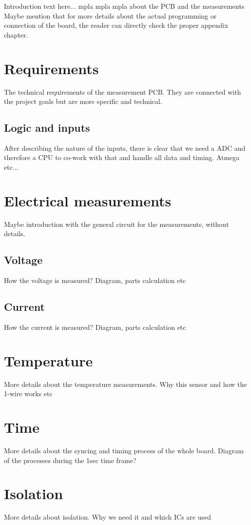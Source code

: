Introduction text here...
mpla mpla mpla about the PCB and the measurements
Maybe mention that for more details about the actual programming or connection of the board, the reader can directly check the proper appendix chapter.

\section{Requirements}
The technical requirements of the measurement PCB.
They are connected with the project goals but are more specific and technical. 

\subsection{Logic and inputs}
After describing the nature of the inputs, there is clear that we need a ADC and therefore a CPU to co-work with that and handle all data and timing.
Atmega etc...

\section{Electrical measurements}
Maybe introduction with the general circuit for the measurements, without details.

\subsection{Voltage}
How the voltage is measured? Diagram, parts calculation etc

\subsection{Current}
How the current is measured? Diagram, parts calculation etc

\section{Temperature}
More details about the temperature measurements. Why this sensor and how the 1-wire works etc

\section{Time}
More details about the syncing and timing process of the whole board.
Diagram of the processes during the 1sec time frame?

\section{Isolation}
More details about isolation.
Why we need it and which ICs are used

